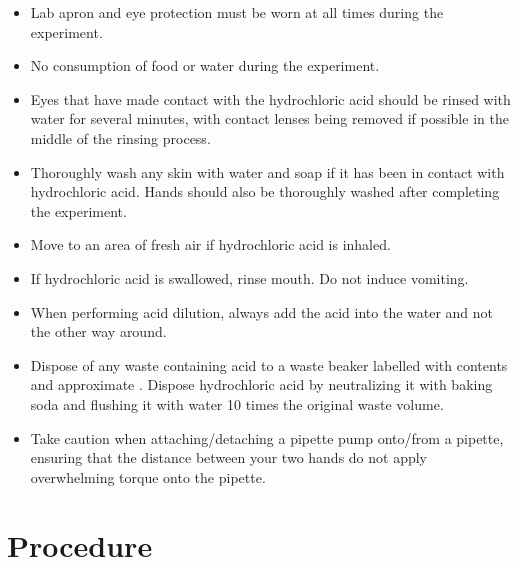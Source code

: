 \documentclass[11pt, letterpaper]{article}
\begin{document}
\begin{paracol}{2}
    \begin{itemize}
        \item Lab apron and eye protection must be worn at all times during the experiment.
        \item No consumption of food or water during the experiment.
        \item Eyes that have made contact with the hydrochloric acid should be rinsed with water for several minutes, with contact lenses being removed if possible in the middle of the rinsing process.
        \item Thoroughly wash any skin with water and soap if it has been in contact with hydrochloric acid. Hands should also be thoroughly washed after completing the experiment.
        \item Move to an area of fresh air if hydrochloric acid is inhaled.
    \end{itemize}
    \switchcolumn
    \begin{itemize}
        \item If hydrochloric acid is swallowed, rinse mouth. Do not induce vomiting.
        \item When performing acid dilution, always add the acid into the water and not the other way around.
        \item Dispose of any waste containing acid to a waste beaker labelled with contents and approximate \ce{[H+]}. Dispose hydrochloric acid by neutralizing it with baking soda and flushing it with water 10 times the original waste volume.
        \item Take caution when attaching/detaching a pipette pump onto/from a pipette, ensuring that the distance between your two hands do not apply overwhelming torque onto the pipette.
    \end{itemize}
\end{paracol}

\section{Procedure}
\end{document}
